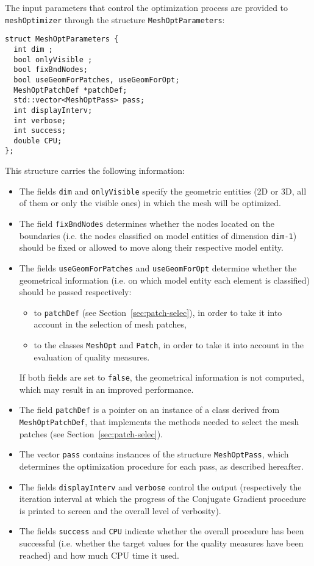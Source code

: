 \documentclass[12pt,a4paper,a4wide]{article}
\begin{document}
The input parameters that control the optimization process are
provided to \texttt{meshOptimizer} through the structure
\texttt{MeshOptParameters}:

\begin{verbatim}
struct MeshOptParameters {
  int dim ;
  bool onlyVisible ;
  bool fixBndNodes;
  bool useGeomForPatches, useGeomForOpt;
  MeshOptPatchDef *patchDef;
  std::vector<MeshOptPass> pass;
  int displayInterv;
  int verbose;
  int success;
  double CPU;
};
\end{verbatim}

This structure carries the following information:
\begin{itemize}
\item The fields \texttt{dim} and \texttt{onlyVisible} specify the
geometric entities (2D or 3D, all of them or only the visible ones)
in which the mesh will be optimized.
\item The field \texttt{fixBndNodes} determines whether the nodes
located on the boundaries (i.e. the nodes classified on model
entities of dimension \texttt{dim-1}) should be fixed or allowed to
move along their respective model entity.
\item The fields \texttt{useGeomForPatches} and \texttt{useGeomForOpt}
determine whether the geometrical information (i.e. on which model
entity each element is classified) should be passed respectively:
\begin{itemize}
\item to \texttt{patchDef} (see Section~\ref{sec:patch-selec}), in
order to take it into account in the selection of mesh patches,
\item to the classes \texttt{MeshOpt} and \texttt{Patch}, in order
to take it into account in the evaluation of quality measures.
\end{itemize}
If both fields are set to \texttt{false}, the geometrical information
is not computed, which may result in an improved performance.
\item The field \texttt{patchDef} is a pointer on an instance of a
class derived from \texttt{MeshOptPatchDef}, that implements the
methods needed to select the mesh patches (see
Section~\ref{sec:patch-selec}).
\item The vector \texttt{pass} contains instances of the structure
\texttt{MeshOptPass}, which determines the optimization procedure
for each pass, as described hereafter.
\item The fields \texttt{displayInterv} and \texttt{verbose} control
the output (respectively the iteration interval at which the progress
of the Conjugate Gradient procedure is printed to screen and the
overall level of verbosity).
\item The fields \texttt{success} and \texttt{CPU} indicate whether
the overall procedure has been successful (i.e. whether the target
values for the quality measures have been reached) and how much CPU
time it used.
\end{itemize}
\end{document}
